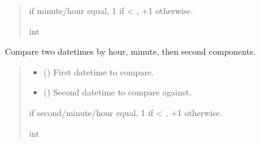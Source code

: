 \documentclass[letterpaper,10pt,english]{sphinxmanual}
\begin{document}
\begin{fulllineitems}
\begin{fulllineitems}
\begin{quote}
\begin{description}
 if minute/hour equal, \sphinxhyphen{}1 if  \textless{} , +1 otherwise.

\sphinxAtStartPar
int

\end{description}\end{quote}

\end{fulllineitems}


\begin{fulllineitems}
\label{\detokenize{apache_commons_validator_python.routines:apache_commons_validator_python.routines.time_validator.TimeValidator.compare_seconds}}
\pysigstartsignatures
{}
\pysigstopsignatures
\sphinxAtStartPar
Compare two datetimes by hour, minute, then second components.
\begin{quote}\begin{description}
\begin{itemize}
\item {} 
\sphinxAtStartPar
{} () \textendash{} First datetime to compare.

\item {} 
\sphinxAtStartPar
{} () \textendash{} Second datetime to compare against.

\end{itemize}

 if second/minute/hour equal, \sphinxhyphen{}1 if  \textless{} , +1 otherwise.

\sphinxAtStartPar
int


\end{description}
\end{quote}
\end{fulllineitems}
\end{fulllineitems}
\end{document}

